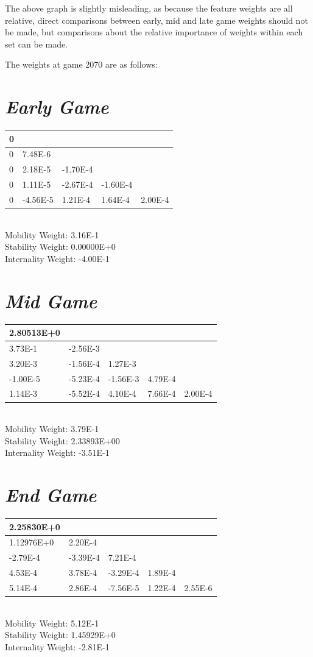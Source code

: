 \documentclass[10pt]{report}
\begin{document}
\begin{multicols}{2}
The above graph is slightly misleading, as because the feature weights are all relative, direct comparisons between early, mid and late game weights should not be made, but comparisons about the relative importance of weights within each set can be made.

The weights at game 2070 are as follows:
\section*{\emph{\textmd{Early Game}}}
\begin{tabular}{| l | l | l | l | l | }
\hline
 0&&&&\\
\hline
 0& 7.48E-6&&&\\
\hline
 0& 2.18E-5&-1.70E-4&&\\
\hline
 0& 1.11E-5&-2.67E-4&-1.60E-4&\\
\hline
 0&-4.56E-5& 1.21E-4& 1.64E-4& 2.00E-4\\
\hline
\end{tabular}
\medskip{}\\
Mobility Weight: 3.16E-1\\
Stability Weight: 0.00000E+0\\
Internality Weight: -4.00E-1
\section*{\emph{\textmd{Mid Game}}}
\begin{tabular}{| l | l | l | l | l | }
\hline
 2.80513E+0&&&&\\
\hline
 3.73E-1&-2.56E-3&&&\\
\hline
 3.20E-3&-1.56E-4& 1.27E-3&&\\
\hline
-1.00E-5&-5.23E-4&-1.56E-3& 4.79E-4&\\
\hline
 1.14E-3&-5.52E-4& 4.10E-4& 7.66E-4& 2.00E-4\\
\hline
\end{tabular}
\medskip{}\\
Mobility Weight: 3.79E-1\\
Stability Weight: 2.33893E+00\\
Internality Weight: -3.51E-1
\section*{\emph{\textmd{End Game}}}
\begin{tabular}{| l | l | l | l | l | }
\hline
 2.25830E+0&&&&\\
\hline
 1.12976E+0& 2.20E-4&&&\\
\hline
-2.79E-4&-3.39E-4& 7.21E-4&&\\
\hline
 4.53E-4& 3.78E-4&-3.29E-4& 1.89E-4&\\
\hline
 5.14E-4& 2.86E-4&-7.56E-5& 1.22E-4& 2.55E-6\\
\hline
\end{tabular}
\medskip{}\\
Mobility Weight: 5.12E-1\\
Stability Weight: 1.45929E+0\\
Internality Weight: -2.81E-1

\end{multicols}
\end{document}
